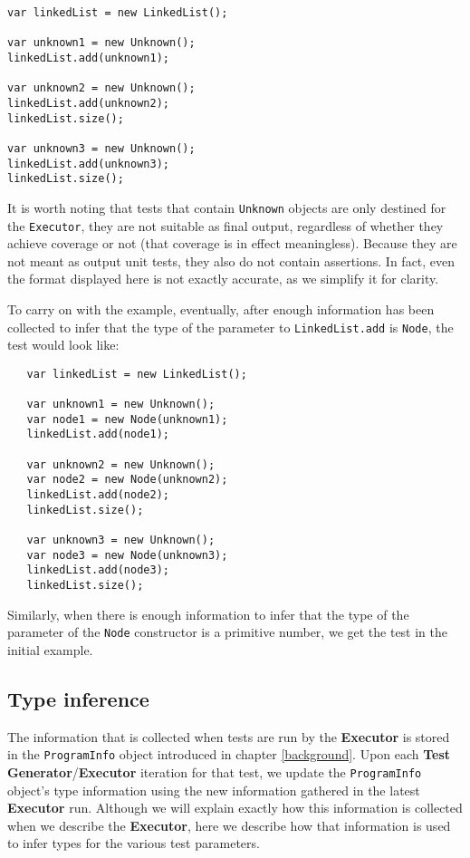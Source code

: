 \begin{lstlisting}
var linkedList = new LinkedList();

var unknown1 = new Unknown();
linkedList.add(unknown1);

var unknown2 = new Unknown();
linkedList.add(unknown2);
linkedList.size();

var unknown3 = new Unknown();
linkedList.add(unknown3);
linkedList.size();
\end{lstlisting}

It is worth noting that tests that contain \texttt{Unknown} objects are only destined for the \texttt{Executor}, they are not suitable as final output, regardless of whether they achieve coverage or not (that coverage is in effect meaningless). Because they are not meant as output unit tests, they also do not contain assertions. In fact, even the format displayed here is not exactly accurate, as we simplify it for clarity.

To carry on with the example, eventually, after enough information has been collected to infer that the type of the parameter to \texttt{LinkedList.add} is \texttt{Node}, the test would look like:

\begin{lstlisting}
   var linkedList = new LinkedList();
   
   var unknown1 = new Unknown();
   var node1 = new Node(unknown1);
   linkedList.add(node1);
   
   var unknown2 = new Unknown();
   var node2 = new Node(unknown2);
   linkedList.add(node2);
   linkedList.size();

   var unknown3 = new Unknown();
   var node3 = new Node(unknown3);
   linkedList.add(node3);
   linkedList.size();
\end{lstlisting}

Similarly, when there is enough information to infer that the type of the parameter of the \texttt{Node} constructor is a primitive number, we get the test in the initial example.

\subsection{Type inference}
The information that is collected when tests are run by the \textbf{Executor} is stored in the \texttt{ProgramInfo} object introduced in chapter \ref{background}. Upon each \textbf{Test Generator}/\textbf{Executor} iteration for that test, we update the \texttt{ProgramInfo} object's type information using the new information gathered in the latest \textbf{Executor} run. Although we will explain exactly how this information is collected when we describe the \textbf{Executor}, here we describe how that information is used to infer types for the various test parameters.


